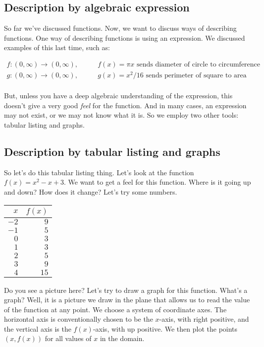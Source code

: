 \documentclass{amsart}
\begin{document}
\subsection{Description by algebraic expression}

So far we've discussed functions. Now, we want to discuss ways
of describing functions. One way of describing functions is using an
expression. We discussed examples of this last time, such as:

\begin{align*}
  f: (0, \infty) \to (0, \infty),& \qquad f(x) = \pi x \text{ sends diameter of circle to circumference}\\
  g: (0, \infty) \to (0, \infty),& \qquad g(x) = x^2/16 \text{ sends perimeter of square to area} \\
\end{align*}

But, unless you have a deep algebraic understanding of the expression,
this doesn't give a very good {\em feel} for the function. And in many
cases, an expression may not exist, or we may not know what it is. So
we employ two other tools: tabular listing and graphs.

\subsection{Description by tabular listing and graphs}

So let's do this tabular listing thing. Let's look at the function
$f(x) = x^2 - x + 3$. We want to get a feel for this function. Where
is it going up and down? How does it change? Let's try some numbers.

\begin{tabular}{|r|r|}
  \hline
  $x$ & $f(x)$ \\
  \hline
  $-2$ & $9$ \\
  $-1$ & $5$ \\
  $0$ & $3$ \\
  $1$ & $3$ \\
  $2$ & $5$ \\
  $3$ & $9$ \\
  $4$ & $15$ \\
  \hline
\end{tabular}

Do you see a picture here? Let's try to draw a graph for this
function. What's a graph? Well, it is a picture we draw in the plane
that allows us to read the value of the function at any point. We
choose a system of coordinate axes. The horizontal axis is
conventionally chosen to be the $x$-axis, with right positive, and the
vertical axis is the $f(x)$-axis, with up positive. We then plot the
points $(x,f(x))$ for all values of $x$ in the domain.
\end{document}
